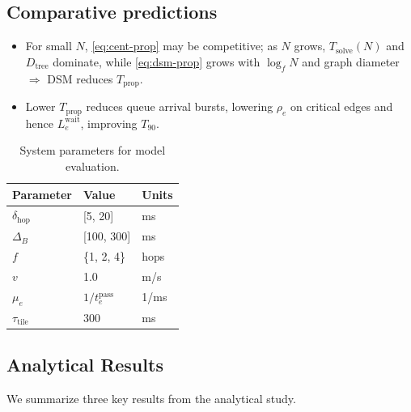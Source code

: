 \subsection*{Comparative predictions}
\begin{itemize}
  \item For small $N$, \eqref{eq:cent-prop} may be competitive; as $N$ grows, $T_{\text{solve}}(N)$ and $D_{\text{tree}}$ dominate, while \eqref{eq:dsm-prop} grows with $\log_f N$ and graph diameter $\Rightarrow$ DSM reduces $T_{\text{prop}}$.
  \item Lower $T_{\text{prop}}$ reduces queue arrival bursts, lowering $\rho_e$ on critical edges and hence $L_{e}^{\text{wait}}$, improving $T_{90}$.
\end{itemize}

\begin{table}[ht]
  \caption{System parameters for model evaluation.}
  \label{sample-params}
  \vskip 0.15in
  \begin{center}
    \begin{small}
      \begin{tabular}{lll}
        \toprule
        Parameter             & Value                 & Units \\
        \midrule
        $\delta_{\text{hop}}$ & [5, 20]               & ms    \\
        $\Delta_B$            & [100, 300]            & ms    \\
        $f$                   & \{1, 2, 4\}           & hops  \\
        $v$                   & 1.0                   & m/s   \\
        $\mu_e$               & $1/t^{\text{pass}}_e$ & 1/ms  \\
        $\tau_{\text{tile}}$  & 300                   & ms    \\
        \bottomrule
      \end{tabular}
    \end{small}
  \end{center}
  \vskip -0.1in
\end{table}

\subsection*{Analytical Results}
We summarize three key results from the analytical study.

